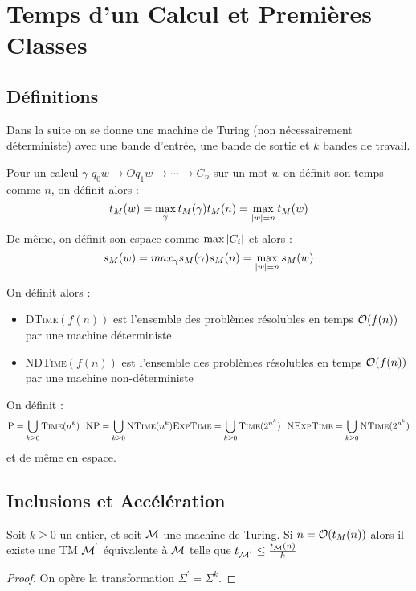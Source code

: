 \documentclass{cours}
\begin{document}
\section{Temps d'un Calcul et Premières Classes}
\subsection{Définitions}
Dans la suite on se donne une machine de Turing (non nécessairement déterministe) avec une bande d'entrée, une bande de sortie et $k$ bandes de travail.
\begin{definition}
    Pour un calcul $\gamma$ $q_{0}w \rightarrow Oq_{1}w \rightarrow \cdots \rightarrow C_{n}$ sur un mot $w$ on définit son temps comme $n$, on définit alors : \[t_{M}(w) = \max_{\gamma} t_{M}(\gamma)\\ t_{M}(n) = \max_{\left|w\right| = n}t_{M}(w)\]
    De même, on définit son espace comme $\max{\left|C_{i}\right|}$ et alors : 
    \[
        s_{M}(w) = max_{\gamma} s_{M}(\gamma)\\
        s_{M}(n) = \max_{\left|w\right| = n}s_{M}(w)
    \]
\end{definition}

On définit alors :
\begin{definition}
    \begin{itemize}
        \item \textsc{DTime}$(f(n))$ est l'ensemble des problèmes résolubles en temps $\mathcal{O}(f(n))$ par une machine déterministe
        \item \textsc{NDTime}$(f(n))$ est l'ensemble des problèmes résolubles en temps $\mathcal{O}(f(n))$ par une machine non-déterministe
    \end{itemize}
\end{definition}

\begin{definition}
    On définit :
    \[
        \textsc{P} = \bigcup_{k \geq 0} \textsc{Time}(n^{k}) \ \    \textsc{NP} = \bigcup_{k \geq 0} \textsc{NTime}(n^{k})\\
        \textsc{ExpTime} = \bigcup_{k \geq 0} \textsc{Time}(2^{n^{k}}) \ \ \textsc{NExpTime} = \bigcup_{k \geq 0} \textsc{NTime}(2^{n^{k}})
    \]
    et de même en espace.
\end{definition}

\subsection{Inclusions et Accélération}
\begin{theorem}
    Soit $k \geq 0$ un entier, et soit $\mathcal{M}$ une machine de Turing. Si $n = \mathcal{O}(t_{M}(n))$ alors il existe une TM $\mathcal{M}^{'}$ équivalente à $\mathcal{M}$ telle que $t_{\mathcal{M}^{'}} \leq \frac{t_{\mathcal{M}}(n)}{k}$
\end{theorem}
\begin{proof}
    On opère la transformation $\Sigma^{'} = \Sigma^{k}$.
\end{proof}
\end{document}
